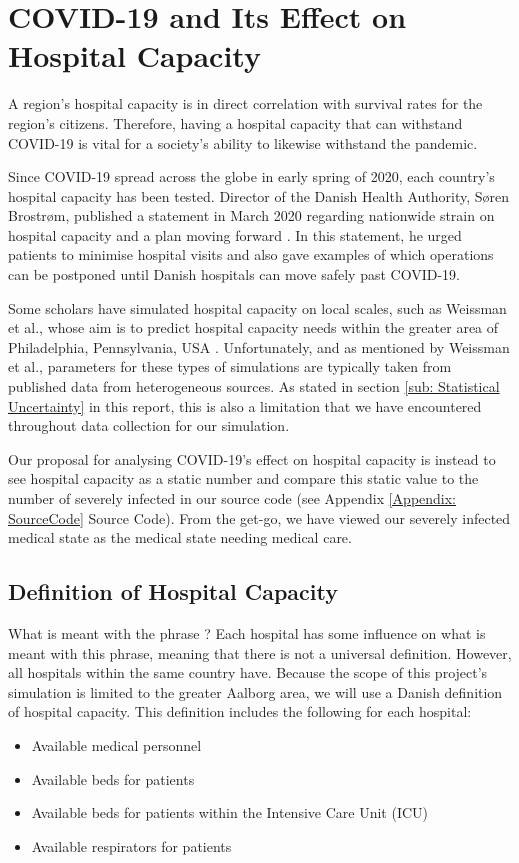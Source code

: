 \section{COVID-19 and Its Effect on Hospital Capacity} \label{sub: Hospital Capacity}

A region's hospital capacity is in direct correlation with survival rates for the region's citizens. Therefore, having a hospital capacity that can withstand COVID-19 is vital for a society's ability to likewise withstand the pandemic. 

Since COVID-19 spread across the globe in early spring of 2020, each country's hospital capacity has been tested. Director of the Danish Health Authority, Søren Brostrøm, published a statement in March 2020 regarding nationwide strain on hospital capacity and a plan moving forward \citep{brostrom_notat_2020}. In this statement, he urged patients to minimise hospital visits and also gave examples of which operations can be postponed until Danish hospitals can move safely past COVID-19.

Some scholars have simulated hospital capacity on local scales, such as Weissman et al., whose aim is to predict hospital capacity needs within the greater area of Philadelphia, Pennsylvania, USA \citep{weissman_locally_2020}. Unfortunately, and as mentioned by Weissman et al., parameters for these types of simulations are typically taken from published data from heterogeneous sources. As stated in section \vref{sub: Statistical Uncertainty} in this report, this is also a limitation that we have encountered throughout data collection for our simulation.

Our proposal for analysing COVID-19's effect on hospital capacity is instead to see hospital capacity as a static number and compare this static value to the number of severely infected in our source code (see Appendix \ref{Appendix: SourceCode} Source Code). From the get-go, we have viewed our severely infected medical state as the medical state needing medical care.

\subsection{Definition of Hospital Capacity}

What is meant with the phrase ? Each hospital has some influence on what is meant with this phrase, meaning that there is not a universal definition. However, all hospitals within the same country have. Because the scope of this project's simulation is limited to the greater Aalborg area, we will use a Danish definition of hospital capacity. This definition includes the following for each hospital:
\begin{itemize}
\item Available medical personnel
\item Available beds for patients
\item Available beds for patients within the Intensive Care Unit (ICU)
\item Available respirators for patients
\end{itemize}

